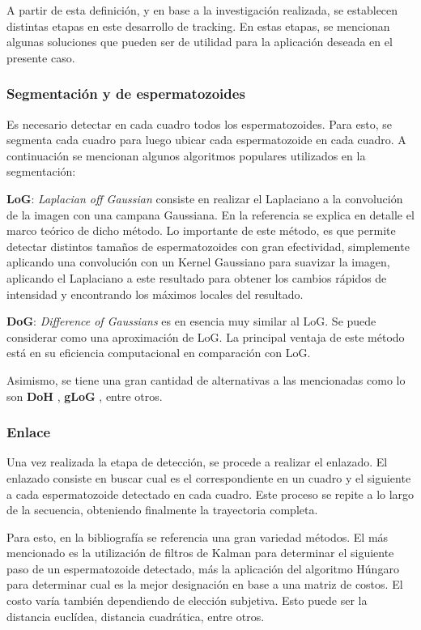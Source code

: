 A partir de esta definición, y en base a la investigación realizada, se establecen distintas etapas en este desarrollo de tracking. En estas etapas, se mencionan algunas soluciones que pueden ser de utilidad para la aplicación deseada en el presente caso. 

\subsubsection{Segmentación y  de espermatozoides}

Es necesario detectar en cada cuadro todos los  espermatozoides. Para esto, se segmenta cada cuadro para luego ubicar cada espermatozoide en cada cuadro. A continuación se mencionan algunos algoritmos populares utilizados en la segmentación:


\textbf{LoG}: \textit{Laplacian off Gaussian} consiste en realizar el Laplaciano a la convolución de la imagen con una campana Gaussiana. En la referencia \cite{LoG} se explica en detalle el marco teórico de dicho método. Lo importante de este método, es que permite detectar distintos tamaños de espermatozoides con gran efectividad, simplemente aplicando una convolución con un Kernel Gaussiano para suavizar la imagen, aplicando el Laplaciano a este resultado para obtener los cambios rápidos de intensidad y encontrando los máximos locales del resultado.



\textbf{DoG}: \textit{Difference of Gaussians} es en esencia muy similar al LoG. Se puede considerar como una aproximación de LoG. La principal ventaja de este método está en su eficiencia computacional en comparación con LoG.



Asimismo, se tiene una gran cantidad de alternativas a las mencionadas como lo son \textbf{DoH} \cite{DoH}, \textbf{gLoG} \cite{LoG}, entre otros.



\subsubsection{Enlace}
Una vez realizada la etapa de detección, se procede a realizar el enlazado. El enlazado consiste en buscar cual es el correspondiente en un cuadro y el siguiente a cada espermatozoide detectado en cada cuadro. Este proceso se repite a lo largo de la secuencia, obteniendo finalmente la trayectoria completa. 

Para esto, en la bibliografía se referencia una gran variedad métodos. El más mencionado es la utilización de filtros de Kalman para determinar el siguiente paso de un espermatozoide detectado, más la aplicación del algoritmo Húngaro para determinar cual es la mejor designación en base a una matriz de costos. El costo varía también dependiendo de elección subjetiva. Esto puede ser la distancia euclídea, distancia cuadrática, entre otros.


